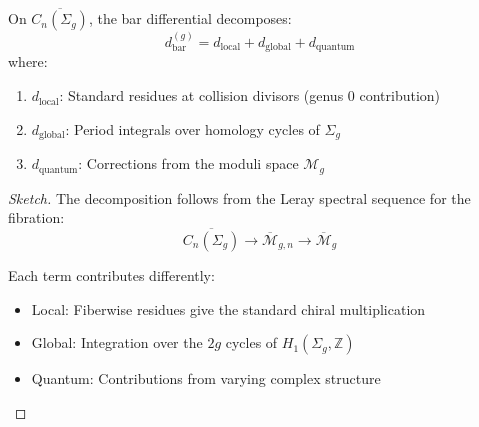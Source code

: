 \begin{theorem}
On $\overline{C_n(\Sigma_g)}$, the bar differential decomposes:
\[
d_{\text{bar}}^{(g)} = d_{\text{local}} + d_{\text{global}} + d_{\text{quantum}}
\]
where:
\begin{enumerate}
\item $d_{\text{local}}$: Standard residues at collision divisors (genus 0 contribution)
\item $d_{\text{global}}$: Period integrals over homology cycles of $\Sigma_g$
\item $d_{\text{quantum}}$: Corrections from the moduli space $\mathcal{M}_g$
\end{enumerate}
\end{theorem}

\begin{proof}[Sketch]
The decomposition follows from the Leray spectral sequence for the fibration:
\[
\overline{C_n(\Sigma_g)} \to \overline{\mathcal{M}}_{g,n} \to \overline{\mathcal{M}}_g
\]

Each term contributes differently:
\begin{itemize}
\item Local: Fiberwise residues give the standard chiral multiplication
\item Global: Integration over the $2g$ cycles of $H_1(\Sigma_g, \mathbb{Z})$
\item Quantum: Contributions from varying complex structure
\end{itemize}
\end{proof}


